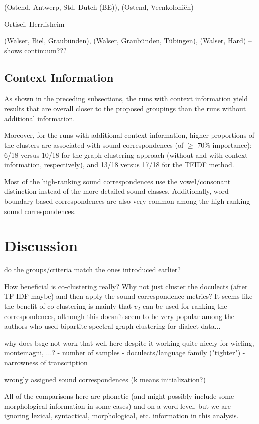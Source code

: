 \documentclass[a4paper]{article}
\begin{document}
(Ostend, Antwerp, Std. Dutch (BE)), (Ostend, Veenkoloni\"{e}n)

Ortisei, Herrlisheim

(Walser, Biel, Graub\"{u}nden), (Walser, Graub\"{u}nden, T\"{u}bingen), (Walser, Hard)
-- shows continuum???


\subsection{Context Information}

As shown in the preceding subsections,
the runs with context information yield results
that are overall closer to the proposed groupings
than the runs without additional information.

Moreover, for the runs with additional context information,
higher proportions of the clusters are associated with
sound correspondences (of $\geq$ 70\% importance):
6/18 versus 10/18 for the graph clustering approach
(without and with context information, respectively),
and 13/18 versus 17/18 for the TFIDF method.

Most of the high-ranking sound correspondences
use the vowel/consonant distinction instead of
the more detailed sound classes.
Additionally, word boundary-based correspondences are also very common
among the high-ranking sound correspondences.

\section{Discussion}
\label{sec:discussion}

do the groups/criteria match the ones introduced earlier?

How beneficial is co-clustering really? Why not just cluster the doculects (after TF-IDF maybe) and then apply the sound correspondence metrics? It seems like the benefit of co-clustering is mainly that $v_2$ can be used for ranking the correspondences, although this doesn't seem to be very popular among the authors who used bipartite spectral graph clustering for dialect data...

why does bsgc not work that well here despite it working quite nicely for wieling, montemagni, ...?
- number of samples
- doculects/language family ("tighter")
- narrowness of transcription

wrongly assigned sound correspondences (k means initialization?)


All of the comparisons here are phonetic (and might possibly include some morphological information in some cases) and on a word level, but we are ignoring lexical, syntactical, morphological, etc. information in this analysis.
\end{document}
